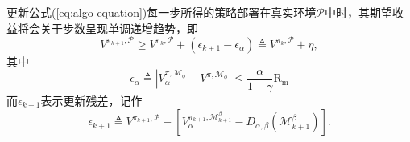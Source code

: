 \begin{theorem}
更新公式(\ref{eq:algo-equation})每一步所得的策略部署在真实环境$\mathcal{P}$中时，其期望收益将会关于步数呈现单调递增趋势，即
\begin{equation}
    {V}^{\pi_{k+1}, \mathcal{P}}\geq {V}^{\pi_{k}, \mathcal{P}} + (\epsilon_{k+1} - \epsilon_\alpha) \triangleq {V}^{\pi_{k}, \mathcal{P}} + \eta,
\end{equation}
其中
\begin{equation}
    \epsilon_\alpha \triangleq |{V}_\alpha^{\pi, \mathcal{M}_{\phi}} - {V}^{\pi,\mathcal{M}_{\phi}}|   \leq \frac{\alpha}{1-\gamma}\mathrm{R_{m}}
\end{equation}
而$\epsilon_{k+1}$表示更新残差，记作
\begin{equation}
    \epsilon_{k+1} \triangleq {V}^{\pi_{k+1}, \mathcal{P}} - \left[{V}_{\alpha}^{\pi_{k+1}, \mathcal{M}_{k+1}^\beta} - D_{\alpha,\beta}(\mathcal{M}_{k+1}^\beta)\right].
\end{equation}
\label{prop:performance}
\end{theorem}


